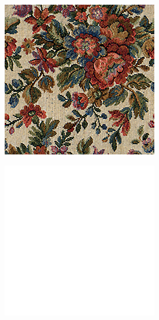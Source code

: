 \begin{figure}[]
    \centering    
    \begin{subfigure}{\textwidth}
        \centering
        \begin{subfigure}{0.24\textwidth}
            \centering
            \includegraphics[width=\textwidth]{images/04-experiment01/flowers/target.jpg}
        \end{subfigure}
        \hfill
        \begin{subfigure}{0.24\textwidth}
            \centering
            \includegraphics[width=\textwidth]{images/04-experiment01/flowers/white_bg.jpg}

\end{subfigure}
\end{subfigure}
\end{figure}

